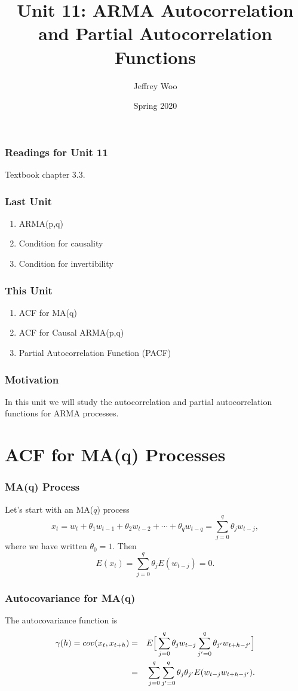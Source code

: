 \documentclass[%
xcolor=pdftex]{beamer}
\title{Unit 11: ARMA Autocorrelation and Partial Autocorrelation Functions}
\author[STAT 5170: Applied Time Series, Unit 11]{Jeffrey Woo}
\institute{Department of Statistics, University of Virginia}
\date{Spring 2020}
\begin{document}
\frame{\titlepage}


\begin{frame}
\frametitle{Readings for Unit 11}

Textbook chapter 3.3.

\end{frame}


\begin{frame}
\frametitle{Last Unit}
\begin{enumerate}
\item ARMA(p,q)
\item Condition for causality
\item Condition for invertibility
\end{enumerate}
\end{frame}


\begin{frame}
\frametitle{This Unit}
\begin{enumerate}
\item ACF for MA(q)
\item ACF for Causal ARMA(p,q)
\item Partial Autocorrelation Function (PACF)
\end{enumerate}
\end{frame}


\begin{frame}
\frametitle{Motivation}

In this unit we will study the autocorrelation and partial autocorrelation
 functions for ARMA processes.

\end{frame}

\section{ACF for MA(q) Processes}
\frame{\tableofcontents[currentsection]}

\begin{frame}
\frametitle{MA(q) Process}

 Let's start with an MA($q$) process
 $$
 x_t = w_t + \theta_1 w_{t-1} + \theta_2 w_{t-2} + \cdots + \theta_q w_{t-q} = \sum^q_{j=0} \theta_j w_{t-j},
 $$
where we have written $\theta_0=1$. Then
$$
E(x_t) =\sum^q_{j=0} \theta_j E(w_{t-j})=0.
$$

\end{frame}

\begin{frame}
\frametitle{Autocovariance for MA(q)}

The autocovariance function is
\begin{eqnarray*}
\gamma(h) = cov(x_t,x_{t+h}) &=& E \Big [ \sum^q_{j=0} \theta_j w_{t-j} \sum^q_{j'=0} \theta_{j'} w_{t+h-j'} \Big ] \cr
&=& \sum^q_{j=0} \sum^q_{j'=0} \theta_j \theta_{j'} E(w_{t-j} w_{t+h-j'}).
\end{eqnarray*}

\end{frame}
\end{document}
